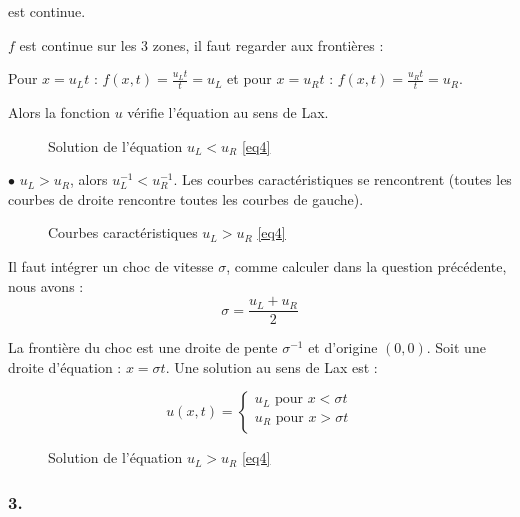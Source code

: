 \documentclass{article}
\begin{document}
est continue.

$f$ est continue sur les 3 zones, il faut regarder aux frontières :

Pour $x = u_L t$ : $f(x,t) = \frac{u_L t}{t} = u_L$ et pour $x = u_R t$ : $f(x,t) = \frac{u_R t}{t} = u_R$.
\newline

Alors la fonction $u$ vérifie l'équation au sens de Lax.

\begin{figure}[H]
  
  \caption{Solution de l'équation $u_L < u_R$ \ref{eq4}}
\end{figure}


$\bullet$ $u_L > u_R$, alors $u_L^{-1} < u_R^{-1}$. Les courbes caractéristiques se rencontrent (toutes les courbes de droite rencontre toutes les courbes de gauche).

\begin{figure}[H]
  
  \caption{Courbes caractéristiques $u_L > u_R$ \ref{eq4}}
\end{figure}

Il faut intégrer un choc de vitesse $\sigma$, comme calculer dans la question précédente, nous avons :
\[ \sigma = \frac{u_L+u_R}{2} \]

La frontière du choc est une droite de pente $\sigma^{-1}$ et d'origine $(0,0)$. Soit une droite d'équation : $x = \sigma t$. Une solution au sens de Lax est :

\[ u(x,t) = \left\{ \begin{matrix}
				u_L \text{ pour } x < \sigma t \\
				u_R \text{ pour } x > \sigma t \\
\end{matrix}\right.
\tag{Sol4.2} \]

\begin{figure}[H]
  
  \caption{Solution de l'équation $u_L > u_R$ \ref{eq4}}
\end{figure}

\subsubsection*{3.}
\end{document}
